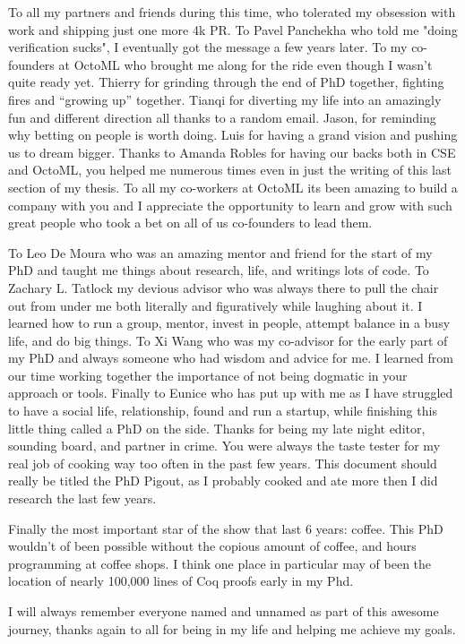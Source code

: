 To all my partners and friends during this time, who tolerated
    my obsession with work and shipping just one more 4k PR.
To Pavel Panchekha who told me "doing verification sucks",
    I eventually got the message a few years later.
To my co-founders at OctoML who brought me along for the ride
    even though I wasn't quite ready yet.
Thierry for grinding through the end of PhD together,
    fighting fires and ``growing up'' together.
Tianqi for diverting my life into an amazingly fun and
    different direction all thanks to a random email.
Jason, for reminding why betting on people is worth doing.
Luis for having a grand vision and pushing us to dream
    bigger.
Thanks to Amanda Robles for having our backs both in CSE
    and OctoML, you helped me numerous times even in just
    the writing of this last section of my thesis.
To all my co-workers at OctoML its been amazing to build
    a company with you and I appreciate the opportunity to
    learn and grow with such great people who took a bet
    on all of us co-founders to lead them.

To Leo De Moura who was an amazing mentor and friend for the start of
    my PhD and taught me things about research, life, and writings lots of code.
To Zachary L. Tatlock my devious advisor who was always there
    to pull the chair out from under me both literally and figuratively
    while laughing about it.
I learned how to run a group, mentor, invest in people, attempt
    balance in a busy life, and do big things.
To Xi Wang who was my co-advisor for the early part of my PhD
    and always someone who had wisdom and advice for me.
I learned from our time working together the importance of
    not being dogmatic in your approach or tools.
Finally to Eunice who has put up with me as I have struggled
    to have a social life, relationship, found and run a startup,
    while finishing this little thing called a PhD on the side.
Thanks for being my late night editor, sounding board, and
    partner in crime.
You were always the taste tester for my real job
    of cooking way too often in the past few years.
This document should really be titled the PhD Pigout, as I probably cooked
    and ate more then I did research the last few years.

Finally the most important star of the show that last 6 years: coffee.
This PhD wouldn't of been possible without the copious amount of coffee,
    and hours programming at coffee shops.
I think one place in particular may of been the location of nearly 100,000
    lines of Coq proofs early in my Phd.

I will always remember everyone named and unnamed as part of this awesome journey,
    thanks again to all for being in my life and helping me achieve my goals.

